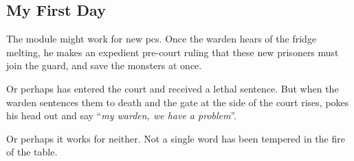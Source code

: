 \subsection{My First Day}

The module might work for new \glspl{pc}.
Once the \gls{warden} hears of the fridge melting, he makes an expedient pre-court ruling that these new prisoners must join the \gls{guard}, and save the \glspl{monster} at once.

Or perhaps  has entered the \gls{court} and received a lethal sentence.
But when the \gls{warden} sentences them to death and the gate at the side of the \gls{court} rises,  pokes his head out and say ``\textit{my \gls{warden}, we have a problem}''.

Or perhaps it works for neither.
Not a single word has been tempered in the fire of the table.
